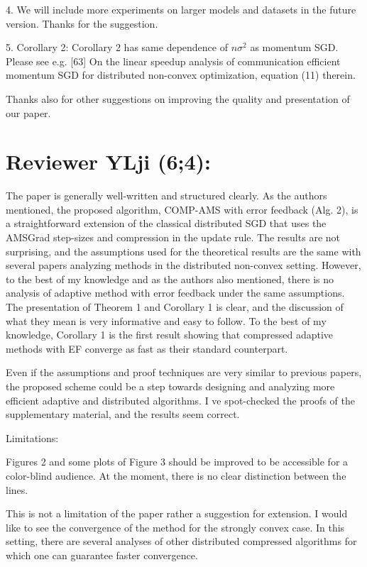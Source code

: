 \documentclass{article}
\begin{document}
4. We will include more experiments on larger models and datasets in the future version. Thanks for the suggestion.

5. Corollary 2: Corollary 2 has same dependence of $n\sigma^2$ as momentum SGD. Please see e.g. [63] On the linear speedup analysis of communication efficient momentum SGD for distributed non-convex optimization, equation (11) therein.

Thanks also for other suggestions on improving the quality and presentation of our paper.



\section{Reviewer YLji (6;4):}

The paper is generally well-written and structured clearly. As the authors mentioned, the proposed algorithm, COMP-AMS with error feedback (Alg. 2), is a straightforward extension of the classical distributed SGD that uses the AMSGrad step-sizes and compression in the update rule. The results are not surprising, and the assumptions used for the theoretical results are the same with several papers analyzing methods in the distributed non-convex setting. However, to the best of my knowledge and as the authors also mentioned, there is no analysis of adaptive method with error feedback under the same assumptions. The presentation of Theorem 1 and Corollary 1 is clear, and the discussion of what they mean is very informative and easy to follow. To the best of my knowledge, Corollary 1 is the first result showing that compressed adaptive methods with EF converge as fast as their standard counterpart.

Even if the assumptions and proof techniques are very similar to previous papers, the proposed scheme could be a step towards designing and analyzing more efficient adaptive and distributed algorithms. I ve spot-checked the proofs of the supplementary material, and the results seem correct.

Limitations:

Figures 2 and some plots of Figure 3 should be improved to be accessible for a color-blind audience. At the moment, there is no clear distinction between the lines.

This is not a limitation of the paper rather a suggestion for extension. I would like to see the convergence of the method for the strongly convex case. In this setting, there are several analyses of other distributed compressed algorithms for which one can guarantee faster convergence.
\end{document}
